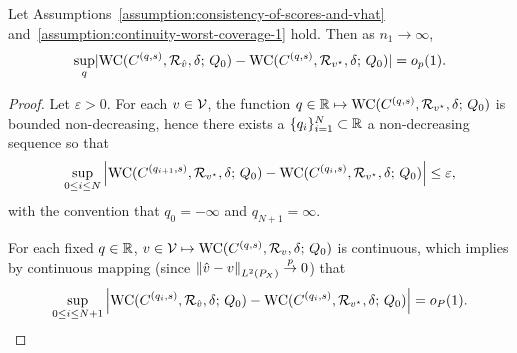 \begin{lemma}
  \label{lem:consistency-of-empirical-worst-direction}
  Let Assumptions~\ref{assumption:consistency-of-scores-and-vhat}
  and~\ref{assumption:continuity-worst-coverage-1} hold.  Then as $n_1 \to
  \infty$,
  \begin{align*}
    \sup_q \lvert \textup{WC}( C^{(q,s)}, \mathcal{R}_{\hat v}, \delta; \, Q_0) 
    -
    \textup{WC}( {C}^{(q, s)}, \mathcal{R}_{v^\star}, \delta; \, Q_0) \rvert = o_p(1).
  \end{align*}
\end{lemma}
\begin{proof}
  
  Let $\varepsilon > 0$.
For each $v \in \mathcal{V}$,  the function $q \in \mathbb{R}  \mapsto \textup{WC}( C^{(q,s)}, \mathcal{R}_{v^\star}, \delta; \, Q_0)$ is bounded non-decreasing, hence there exists a $\{ q_i \}_{i=1}^N \subset \mathbb{R}$ a non-decreasing sequence so that 
\begin{align*}
\sup_{0\le i \le N} \left|  \textup{WC}( C^{(q_{i+1},s)}, \mathcal{R}_{v^\star}, \delta; \, Q_0) -  \textup{WC}( C^{(q_i,s)}, \mathcal{R}_{v^\star}, \delta; \, Q_0) \right| \le \varepsilon,
\end{align*}
with the convention that $q_0 = -\infty$ and $q_{N+1} = \infty$.

For each fixed $q \in \mathbb{R}$, $v \in \mathcal{V} \mapsto \textup{WC}( C^{(q,s)}, \mathcal{R}_{v}, \delta; \, Q_0) $ is continuous,  which implies by continuous mapping (since $\left\|{\hat{v} - v}\right\|_{L^2(P_X)} \stackrel{p}{\rightarrow} 0$) that
\begin{align*}
\sup_{0\le i \le N+1} \left|  \textup{WC}( C^{(q_{i},s)}, \mathcal{R}_{\hat{v}}, \delta; \, Q_0) -  \textup{WC}( C^{(q_i,s)}, \mathcal{R}_{v^\star}, \delta; \, Q_0) \right| = o_P(1).
\end{align*}


\end{proof}
